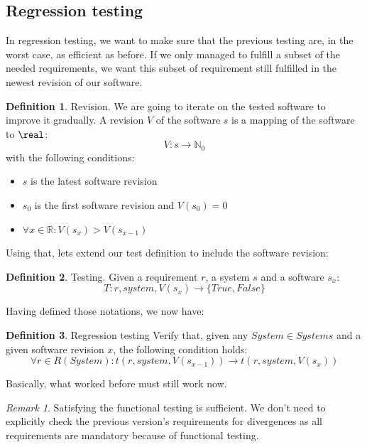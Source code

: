 \documentclass[12pt]{article}
\theoremstyle{definition}
\newtheorem{definition}{Definition}[section]
\theoremstyle{definition}
\theoremstyle{remark}
\newtheorem{remark}{Remark}[section]
\newcommand{\R}{\mathbb{R}}
\begin{document}
\subsection{Regression testing}


In regression testing, we want to make sure that the previous testing are, in the worst case, as efficient as before. If we only managed to fulfill a subset of the needed requirements, we want this subset of requirement still fulfilled in the newest revision of our software.

\theoremstyle{definition}
\begin{definition}{Revision.} We are going to iterate on the tested software to improve it gradually. A revision $V$ of the software $s$ is a mapping of the software to $\real$:
$$
V: s \to \mathbb{N}_0
$$
with the following conditions:
\begin{itemize}
\item $s$ is the latest software revision
\item $s_0$ is the first software revision and $V(s_0) = 0$
\item $\forall x \in \R: V(s_x) > V(s_{x-1})$
\end{itemize}
\end{definition}

Using that, lets extend our test definition to include the software revision:
\theoremstyle{definition}
\begin{definition}{Testing.} Given a requirement $r$, a system $s$ and a software $s_x$:
$$T: r, system,V(s_x) \to \{True, False\}$$
\end{definition}

Having defined those notations, we now have:

\theoremstyle{definition}
\begin{definition}{Regression testing} Verify that, given any $System \in Systems$ and a given software revision $x$, the following condition holds:
$$
\forall r \in R(System): t(r, system, V(s_{x-1})) \rightarrow t(r, system, V(s_x))
$$
\end{definition}

Basically, what worked before must still work now.

\theoremstyle{remark}
\begin{remark} Satisfying the functional testing is sufficient. We don't need to explicitly check the previous version's requirements for divergences as all requirements are mandatory because of functional testing.
\end{remark}
\end{document}
